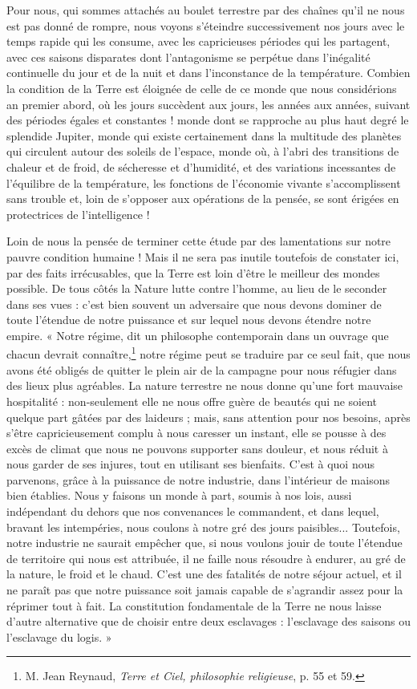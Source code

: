 \documentclass[a4paper, 11pt, oneside]{article}
\begin{document}
Pour nous, qui sommes attachés au boulet terrestre par des chaînes qu'il ne nous est pas donné de rompre, nous voyons s'éteindre successivement nos jours avec le temps rapide qui les consume, avec les capricieuses périodes qui les partagent, avec ces saisons disparates dont l'antagonisme se perpétue dans l'inégalité continuelle du jour et de la nuit et dans l'inconstance de la température. Combien la condition de la Terre est éloignée de celle de ce monde que nous considérions an premier abord, où les jours succèdent aux jours, les années aux années, suivant des périodes égales et constantes ! monde dont se rapproche au plus haut degré le splendide Jupiter, monde qui existe certainement dans la multitude des planètes qui circulent autour des soleils de l'espace, monde où, à l'abri des transitions de chaleur et de froid, de sécheresse et d'humidité, et des variations incessantes de l'équilibre de la température, les fonctions de l'économie vivante s'accomplissent sans trouble et, loin de s'opposer aux opérations de la pensée, se sont érigées en protectrices de l'intelligence !

Loin de nous la pensée de terminer cette étude par des lamentations sur notre pauvre condition humaine ! Mais il ne sera pas inutile toutefois de constater ici, par des faits irrécusables, que la Terre est loin d'être le meilleur des mondes possible. De tous côtés la Nature lutte contre l'homme, au lieu de le seconder dans ses vues : c'est bien souvent un adversaire que nous devons dominer de toute l'étendue de notre puissance et sur lequel nous devons étendre notre empire. « Notre régime, dit un philosophe contemporain dans un ouvrage que chacun devrait connaître,\footnote{M. Jean Reynaud, \emph{Terre et Ciel, philosophie religieuse}, p. 55 et 59.} notre régime peut se traduire par ce seul fait, que nous avons été obligés de quitter le plein air de la campagne pour nous réfugier dans des lieux plus agréables. La nature terrestre ne nous donne qu'une fort mauvaise hospitalité : non-seulement elle ne nous offre guère de beautés qui ne soient quelque part gâtées par des laideurs ; mais, sans attention pour nos besoins, après s'être capricieusement complu à nous caresser un instant, elle se pousse à des excès de climat que nous ne pouvons supporter sans douleur, et nous réduit à nous garder de ses injures, tout en utilisant ses bienfaits. C'est à quoi nous parvenons, grâce à la puissance de notre industrie, dans l'intérieur de maisons bien établies. Nous y faisons un monde à part, soumis à nos lois, aussi indépendant du dehors que nos convenances le commandent, et dans lequel, bravant les intempéries, nous coulons à notre gré des jours paisibles... Toutefois, notre industrie ne saurait empêcher que, si nous voulons jouir de toute l'étendue de territoire qui nous est attribuée, il ne faille nous résoudre à endurer, au gré de la nature, le froid et le chaud. C'est une des fatalités de notre séjour actuel, et il ne paraît pas que notre puissance soit jamais capable de s'agrandir assez pour la réprimer tout à fait. La constitution fondamentale de la Terre ne nous laisse d'autre alternative que de choisir entre deux esclavages : l'esclavage des saisons ou l'esclavage du logis. »
\end{document}
